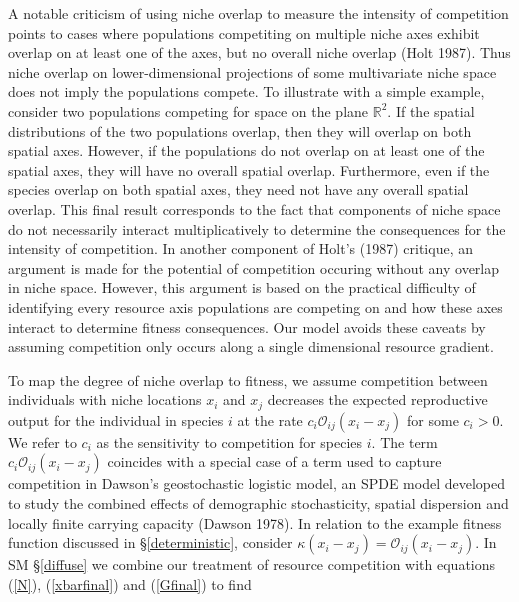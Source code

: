 \documentclass[]{article}
\begin{document}
A notable criticism of using niche overlap to measure the intensity of
competition points to cases where populations competiting on multiple
niche axes exhibit overlap on at least one of the axes, but no overall
niche overlap (Holt 1987). Thus niche overlap on lower-dimensional
projections of some multivariate niche space does not imply the
populations compete. To illustrate with a simple example, consider two
populations competing for space on the plane \(\mathbb{R}^2\). If the
spatial distributions of the two populations overlap, then they will
overlap on both spatial axes. However, if the populations do not overlap
on at least one of the spatial axes, they will have no overall spatial
overlap. Furthermore, even if the species overlap on both spatial axes,
they need not have any overall spatial overlap. This final result
corresponds to the fact that components of niche space do not
necessarily interact multiplicatively to determine the consequences for
the intensity of competition. In another component of Holt's (1987)
critique, an argument is made for the potential of competition occuring
without any overlap in niche space. However, this argument is based on
the practical difficulty of identifying every resource axis populations
are competing on and how these axes interact to determine fitness
consequences. Our model avoids these caveats by assuming competition
only occurs along a single dimensional resource gradient.

To map the degree of niche overlap to fitness, we assume competition
between individuals with niche locations \(x_i\) and \(x_j\) decreases
the expected reproductive output for the individual in species \(i\) at
the rate \(c_i\mathcal{O}_{ij}(x_i-x_j)\) for some \(c_i>0\). We refer
to \(c_i\) as the sensitivity to competition for species \(i\). The term
\(c_i\mathcal{O}_{ij}(x_i-x_j)\) coincides with a special case of a term
used to capture competition in Dawson's geostochastic logistic model, an
SPDE model developed to study the combined effects of demographic
stochasticity, spatial dispersion and locally finite carrying capacity
(Dawson 1978). In relation to the example fitness function discussed in
\S\ref{deterministic}, consider
\(\kappa(x_i-x_j)=\mathcal{O}_{ij}(x_i-x_j)\). In SM \S\ref{diffuse} we
combine our treatment of resource competition with equations (\ref{N}),
(\ref{xbarfinal}) and (\ref{Gfinal}) to find
\end{document}

